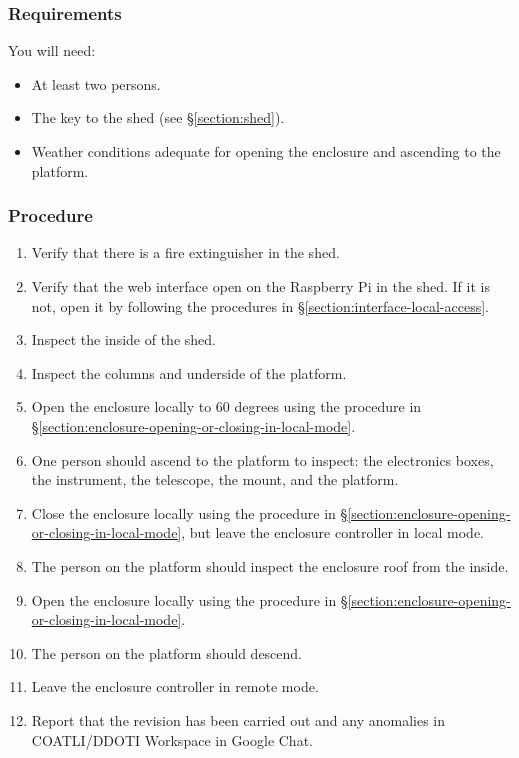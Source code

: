 \subsubsection{Requirements}

You will need:
\begin{itemize}
\item At least two persons.
\item The key to the shed (see \S\ref{section:shed}).
\item Weather conditions adequate for opening the enclosure and ascending to the platform.
\end{itemize}

\subsubsection{Procedure}

\begin{enumerate}
\item
Verify that there is a fire extinguisher in the shed.
\item 
Verify that the web interface open on the Raspberry Pi in the shed. If it is not, open it by following the procedures in \S\ref{section:interface-local-access}.
\item 
Inspect the inside of the shed. 
\item 
Inspect the columns and underside of the platform.
\item
Open the enclosure locally to 60 degrees using the procedure in \S\ref{section:enclosure-opening-or-closing-in-local-mode}.
\item
One person should ascend to the platform to inspect: the electronics boxes, the instrument, the telescope, the mount, and the platform.
\item
Close the enclosure locally using the procedure in \S\ref{section:enclosure-opening-or-closing-in-local-mode}, but leave the enclosure controller in local mode.
\item
The person on the platform should inspect the enclosure roof from the inside.
\item
Open the enclosure locally using the procedure in \S\ref{section:enclosure-opening-or-closing-in-local-mode}.
\item
The person on the platform should descend.
\item
Leave the enclosure controller in remote mode.
\item
Report that the revision has been carried out and any anomalies in COATLI/DDOTI Workspace in Google Chat.
\end{enumerate}

